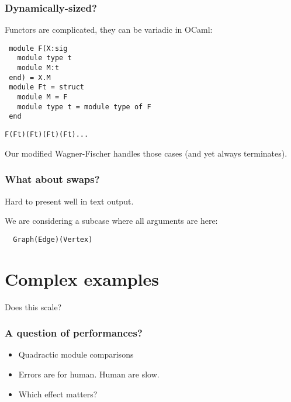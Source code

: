\documentclass[11pt,aspectratio=169]{beamer}
\begin{document}
\begin{frame}[fragile]\frametitle{Dynamically-sized?}
  Functors are complicated, they can be variadic in OCaml:
   \begin{verbatim}
 module F(X:sig
   module type t
   module M:t
 end) = X.M
 module Ft = struct
   module M = F
   module type t = module type of F
 end
\end{verbatim}

\begin{verbatim}
F(Ft)(Ft)(Ft)(Ft)...
\end{verbatim}

  Our modified Wagner-Fischer handles those cases (and yet always terminates).
\end{frame}

\begin{frame}[fragile]\frametitle{What about swaps?}
  Hard to present well in text output.

  We are considering a subcase where all arguments are here:
\begin{verbatim}
  Graph(Edge)(Vertex)
\end{verbatim}
\end{frame}



\section{Complex examples}

\begin{frame}[standout]
  \centering \Huge Does this scale?
\end{frame}


\begin{frame}[fragile] \frametitle{A question of performances?}
  \begin{itemize}
    \item{Quadractic module comparisons}
    \item{Errors are for human. Human are slow.}
    \item{Which effect matters?}
  \end{itemize}
\end{frame}
\end{document}
